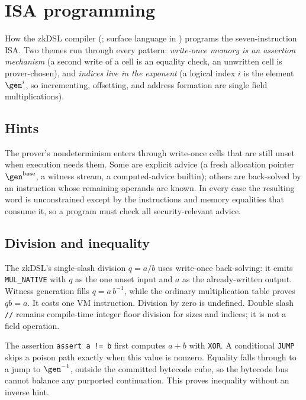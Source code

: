 \section{ISA programming}\label{sec:isa-programming}

How the zkDSL compiler (; surface language in ) programs the seven-instruction ISA. Two themes run through every pattern: \emph{write-once memory is an assertion mechanism} (a second write of a cell is an equality check, an unwritten cell is prover-chosen), and \emph{indices live in the exponent} (a logical index $i$ is the element $\gen^{i}$, so incrementing, offsetting, and address formation are single field multiplications).

\subsection{Hints}\label{sec:prog-hints}

The prover's nondeterminism enters through write-once cells that are still unset when execution needs them. Some are explicit advice (a fresh allocation pointer $\gen^{\mathrm{base}}$, a witness stream, a computed-advice builtin); others are back-solved by an instruction whose remaining operands are known. In every case the resulting word is unconstrained except by the instructions and memory equalities that consume it, so a program must check all security-relevant advice.

\subsection{Division and inequality}\label{sec:prog-div-ne}

The zkDSL's single-slash division $q=a/b$ uses write-once back-solving: it emits \texttt{MUL\_NATIVE} with $q$ as the one unset input and $a$ as the already-written output. Witness generation fills $q=a\,b^{-1}$, while the ordinary multiplication table proves $q b=a$. It costs one VM instruction. Division by zero is undefined. Double slash \texttt{//} remains compile-time integer floor division for sizes and indices; it is not a field operation.

The assertion \texttt{assert a != b} first computes $a+b$ with \texttt{XOR}. A conditional \texttt{JUMP} skips a poison path exactly when this value is nonzero. Equality falls through to a jump to $\gen^{-1}$, outside the committed bytecode cube, so the bytecode bus cannot balance any purported continuation. This proves inequality without an inverse hint.

